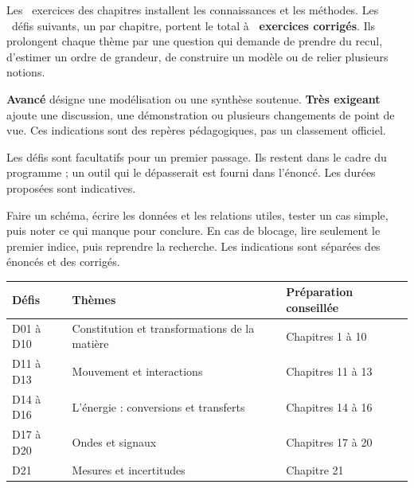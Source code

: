 \clearpage
\gdef\otChapNum{0}\pagestyle{otFront}
\label{defis-debut}
\fontsize{11}{16}\selectfont
Les \otNbExosChapitres\ exercices des chapitres installent les connaissances et les méthodes.
Les \otNbDefis\ défis suivants, un par chapitre, portent le total à \textbf{\otNbExosTotal\ exercices corrigés}.
Ils prolongent chaque thème par une question qui demande de prendre du recul, d'estimer un ordre de grandeur,
de construire un modèle ou de relier plusieurs notions.\par\vspace{4mm}
\textbf{Avancé} désigne une modélisation ou une synthèse soutenue.
\textbf{Très exigeant} ajoute une discussion, une démonstration ou plusieurs changements de point de vue.
Ces indications sont des repères pédagogiques, pas un classement officiel.\par\vspace{4mm}
Les défis sont facultatifs pour un premier passage. Ils restent dans le cadre du programme ; un outil qui
le dépasserait est fourni dans l'énoncé. Les durées proposées sont indicatives.\par\vspace{5mm}
Faire un schéma, écrire les données et les relations utiles, tester un cas simple, puis noter ce qui manque
pour conclure. En cas de blocage, lire seulement le premier indice, puis reprendre la recherche.
Les indications sont séparées des énoncés et des corrigés.
\begin{center}\renewcommand{\arraystretch}{1.25}
\begin{tabular}{@{}lll@{}}\toprule
Défis & Thèmes & Préparation conseillée\\\midrule
D01 à D10 & Constitution et transformations de la matière & Chapitres 1 à 10\\
D11 à D13 & Mouvement et interactions & Chapitres 11 à 13\\
D14 à D16 & L'énergie : conversions et transferts & Chapitres 14 à 16\\
D17 à D20 & Ondes et signaux & Chapitres 17 à 20\\
D21 & Mesures et incertitudes & Chapitre 21\\\bottomrule
\end{tabular}\end{center}

